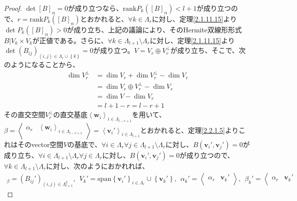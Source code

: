 \documentclass[dvipdfmx]{jsarticle}
\begin{document}
\begin{proof}
$\det[ B]_{\alpha}= 0$が成り立つなら、$\mathrm{rank}{P_{k}\left( [ B]_{\alpha} \right)} < l + 1$が成り立つので、$r = \mathrm{rank}{P_{k}\left( [ B]_{\alpha} \right)}$とおかれると、$\forall k \in \varLambda_{r}$に対し、定理\ref{2.1.11.15}より$\det{P_{k}\left( [ B]_{\alpha} \right)} > 0$が成り立ち、上記の議論により、そのHermite双線形形式$B|V_{k} \times V_{k}$が正値である。さらに、$\forall k \in \varLambda_{l + 1} \setminus \varLambda_{r}$に対し、定理\ref{2.1.11.15}より$\det\left( B_{ij} \right)_{(i,j) \in \varLambda_{r} \cup \left\{ k \right\}} = 0$が成り立つ。$V = V_{r} \oplus V_{r}^{\bot}$が成り立ち、そこで、次のようになることから、
\begin{align*}
\dim V_{r}^{\bot} &= \dim V_{r} + \dim V_{r}^{\bot} - \dim V_{r}\\
&= \dim{V_{r} \oplus V_{r}^{\bot}} - \dim V_{r}\\
&= \dim V - \dim V_{r}\\
&= l + 1 - r = l - r + 1
\end{align*}
その直交空間$V_{r}^{\bot}$の直交基底$\left\langle \mathbf{w}_{i} \right\rangle_{i \in \varLambda_{l - r + 1}}$を用いて、$\beta = \left\langle \begin{matrix}
\alpha_{r} & \left\langle \mathbf{w}_{i} \right\rangle_{i \in \varLambda_{l - r + 1}} \\
\end{matrix} \right\rangle = \left\langle \mathbf{v}_{i}' \right\rangle_{i \in \varLambda_{l + 1}}$とおかれると、定理\ref{2.2.1.5}よりこれはそのvector空間$V$の基底で、$\forall i \in \varLambda_{r}\forall j \in \varLambda_{l + 1} \setminus \varLambda_{r}$に対し、$B\left( \mathbf{v}_{i}',\mathbf{v}_{j}' \right) = 0$が成り立ち、$\forall i \in \varLambda_{l + 1} \setminus \varLambda_{r}\forall j \in \varLambda_{r}$に対し、$B\left( \mathbf{v}_{i}',\mathbf{v}_{j}' \right) = 0$が成り立つので、$\forall k \in \varLambda_{l + 1} \setminus \varLambda_{r}$に対し、次のようにおかれれば、
\begin{align*}
[ B]_{\beta} = \left( B_{ij}' \right)_{(i,j) \in \varLambda_{l + 1}^{2}},\ \ V_{k}' = \mathrm{span}{\left\{ \mathbf{v}_{i}' \right\}_{i \in \varLambda_{r}} \cup \left\{ \mathbf{v}_{k}' \right\}},\ \ \alpha_{k}' = \left\langle \begin{matrix}
\alpha_{r} & \mathbf{v}_{k}' \\
\end{matrix} \right\rangle,\ \ \beta_{k}' = \left\langle \begin{matrix}
\alpha_{r} & \mathbf{v}_{k}' \\

\end{matrix}
\end{align*}
\end{proof}
\end{document}
